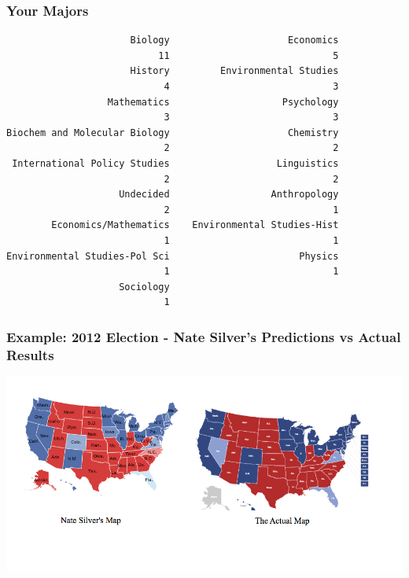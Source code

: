 \documentclass[handout]{beamer}
\begin{document}
\begin{frame}[fragile]
\frametitle{Your Majors}
\begin{small}
\begin{verbatim}
                      Biology                     Economics 
                           11                             5 
                      History         Environmental Studies 
                            4                             3 
                  Mathematics                    Psychology 
                            3                             3 
Biochem and Molecular Biology                     Chemistry 
                            2                             2 
 International Policy Studies                   Linguistics 
                            2                             2 
                    Undecided                  Anthropology 
                            2                             1 
        Economics/Mathematics    Environmental Studies-Hist 
                            1                             1 
Environmental Studies-Pol Sci                       Physics 
                            1                             1 
                    Sociology 
                            1 
\end{verbatim}
\end{small}
\end{frame}


\begin{frame}[fragile]
\frametitle{Example: 2012 Election - Nate Silver's Predictions vs Actual Results}
\begin{center}
\includegraphics[width=\textwidth]{figure/nate_silver.jpg}
\end{center}
\begin{center}
\end{center}
\end{frame}
\end{document}
